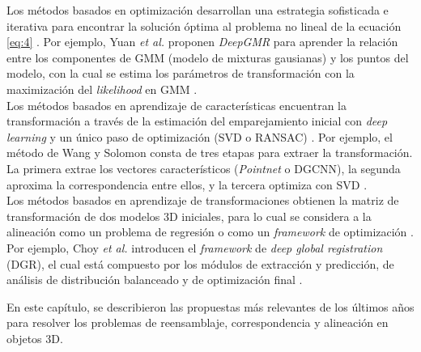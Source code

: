Los métodos basados en optimización desarrollan una estrategia sofisticada e iterativa para encontrar la solución óptima al problema no lineal de la ecuación \ref{eq:4} \cite{9}. Por ejemplo, Yuan \textit{et al.} proponen \textit{DeepGMR} para aprender la relación entre los componentes de GMM (modelo de mixturas gausianas) y los puntos del modelo, con la cual se estima los parámetros de transformación con la maximización del \textit{likelihood} en GMM \cite{f7}. \\

Los métodos basados en aprendizaje de características encuentran la transformación a través de la estimación del emparejamiento inicial con \textit{deep learning} y un único paso de optimización (SVD o RANSAC) \cite{9}. Por ejemplo, el método de Wang y Solomon consta de tres etapas para extraer la transformación. La primera extrae los vectores característicos (\textit{Pointnet} o DGCNN), la segunda aproxima la correspondencia entre ellos, y la tercera optimiza con SVD \cite{16}. \\

Los métodos basados en aprendizaje de transformaciones obtienen la matriz de transformación de dos modelos 3D iniciales, para lo cual se considera a la alineación como un problema de regresión o como un \textit{framework} de optimización \cite{9}. Por ejemplo, Choy \textit{et al.} introducen el \textit{framework} de \textit{deep global registration} (DGR), el cual está compuesto por los módulos de extracción y predicción, de análisis de distribución balanceado y de optimización final \cite{10}.

\hfill \break

En este capítulo, se describieron las propuestas más relevantes de los últimos años para resolver los problemas de reensamblaje, correspondencia y alineación en objetos 3D.

